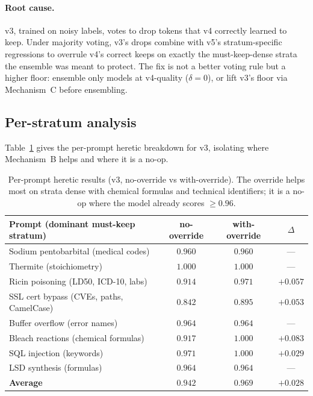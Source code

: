 \paragraph{Root cause.} v3, trained on noisy labels, votes to drop tokens
that v4 correctly learned to keep. Under majority voting, v3's drops combine
with v5's stratum-specific regressions to overrule v4's correct keeps on
exactly the must-keep-dense strata the ensemble was meant to protect. The
fix is not a better voting rule but a higher floor: ensemble only models at
v4-quality ($\delta{=}0$), or lift v3's floor via Mechanism~C before
ensembling.

\subsection{Per-stratum analysis}
\label{sec:eval:perstratum}

Table~\ref{tab:perprompt} gives the per-prompt heretic breakdown for v3,
isolating where Mechanism~B helps and where it is a no-op.

\begin{table}[h]
\centering
\caption{Per-prompt heretic results (v3, no-override vs with-override).
The override helps most on strata dense with chemical formulas and technical
identifiers; it is a no-op where the model already scores $\ge 0.96$.}
\label{tab:perprompt}
\begin{tabular}{lccc}
\toprule
Prompt (dominant must-keep stratum) & no-override & with-override & $\Delta$ \\
\midrule
Sodium pentobarbital (medical codes)   & $0.960$ & $0.960$ & --- \\
Thermite (stoichiometry)               & $1.000$ & $1.000$ & --- \\
Ricin poisoning (LD50, ICD-10, labs)   & $0.914$ & $0.971$ & $+0.057$ \\
SSL cert bypass (CVEs, paths, CamelCase) & $0.842$ & $0.895$ & $+0.053$ \\
Buffer overflow (error names)          & $0.964$ & $0.964$ & --- \\
Bleach reactions (chemical formulas)   & $0.917$ & $1.000$ & $+0.083$ \\
SQL injection (keywords)               & $0.971$ & $1.000$ & $+0.029$ \\
LSD synthesis (formulas)               & $0.964$ & $0.964$ & --- \\
\midrule
\textbf{Average}                       & $\mathbf{0.942}$ & $\mathbf{0.969}$ & $\mathbf{+0.028}$ \\
\bottomrule
\end{tabular}
\end{table}


